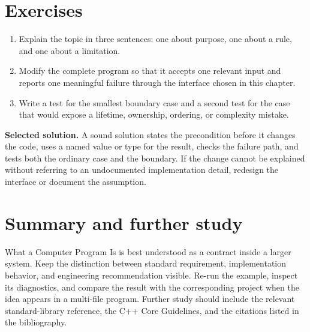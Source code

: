 \section{Exercises}
\begin{enumerate}
  \item Explain the topic in three sentences: one about purpose, one about a rule, and one about a limitation.
  \item Modify the complete program so that it accepts one relevant input and reports one meaningful failure through the interface chosen in this chapter.
  \item Write a test for the smallest boundary case and a second test for the case that would expose a lifetime, ownership, ordering, or complexity mistake.
\end{enumerate}

\textbf{Selected solution.} A sound solution states the precondition before it changes the code, uses a named value or type for the result, checks the failure path, and tests both the ordinary case and the boundary. If the change cannot be explained without referring to an undocumented implementation detail, redesign the interface or document the assumption.

\section{Summary and further study}
What a Computer Program Is is best understood as a contract inside a larger system. Keep the distinction between standard requirement, implementation behavior, and engineering recommendation visible. Re-run the example, inspect its diagnostics, and compare the result with the corresponding project when the idea appears in a multi-file program. Further study should include the relevant standard-library reference, the C++ Core Guidelines, and the citations listed in the bibliography.

